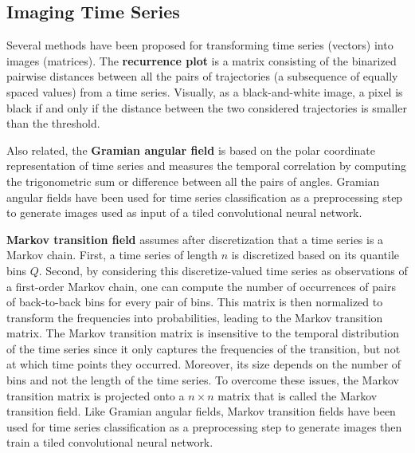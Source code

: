 \subsection{Imaging Time Series}



Several methods have been proposed for transforming time series (vectors) into images (matrices). 
The \textbf{recurrence plot} \cite{eckmann1995recurrence} is a matrix consisting of the binarized pairwise distances between all the pairs of trajectories (a subsequence of equally spaced values) from a time series. Visually, as a black-and-white image, a pixel is black if and only if the distance between the two considered trajectories is smaller than the threshold.

Also related, the \textbf{Gramian angular field} \cite{wang2015encoding} is based on the polar coordinate representation of time series and measures the temporal correlation by computing the trigonometric sum or difference between all the pairs of angles. Gramian angular fields have been used for time series classification as a preprocessing step to generate images used as input of a tiled convolutional neural network.

\textbf{Markov transition field} \cite{wang2015encoding} assumes after discretization that a time series is a Markov chain. First, a time series of length $n$ is discretized based on its quantile bins $Q$. Second, by considering this discretize-valued time series as observations of a first-order Markov chain, one can compute the number of occurrences of pairs of back-to-back bins for every pair of bins. This matrix is then normalized to transform the frequencies into probabilities, leading to the Markov transition matrix. The Markov transition matrix is insensitive to the temporal distribution of the time series since it only captures the frequencies of the transition, but not at which time points they occurred. Moreover, its size depends on the number of bins and not the length of the time series. To overcome these issues, the Markov transition matrix is projected onto a $n \times n$ matrix that is called the Markov transition field. Like Gramian angular fields, Markov transition fields have been used for time series classification as a preprocessing step to generate images then train a tiled convolutional neural network. 

